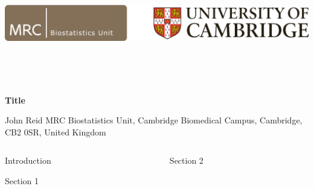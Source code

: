 \documentclass[t, final, 32pt]{beamer}
\begin{document}
\begin{frame}{}

%
\begin{block}{
  \vspace{48pt}

  \includegraphics[height=150pt]{MRC_Biostatistics_Cambridge}
}
  \vspace{24pt}

  \fontsize{82pt}{82pt}\selectfont \textcolor{mrcblue}{\textbf{Title}}

  \vspace{24pt}

  \fontsize{36pt}{36pt}\selectfont
  \textcolor{mrcblue}{
    John Reid
    \hspace{30pt}
    MRC Biostatistics Unit,
    Cambridge Biomedical Campus,
    Cambridge, CB2 0SR,
    United Kingdom}
\end{block}


%


\begin{columns}[t]
\begin{column}{.31\linewidth}
\begin{block}{Introduction}

  \blindtext
\end{block}

\begin{block}{Section 1}

  \blinditemize
\end{block}
\end{column}


\begin{column}{.31\linewidth}
\begin{block}{Section 2}


\end{block}
\end{column}
\end{columns}
\end{frame}
\end{document}
